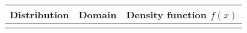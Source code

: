 \begin{tabularx}{\linewidth}{llX}
  Distribution & Domain & Density function $f(x)$ \\
  \midrule
  \rule{0pt}{5ex}%
  \rule{0pt}{5ex}%
\end{tabularx}

\endgroup
